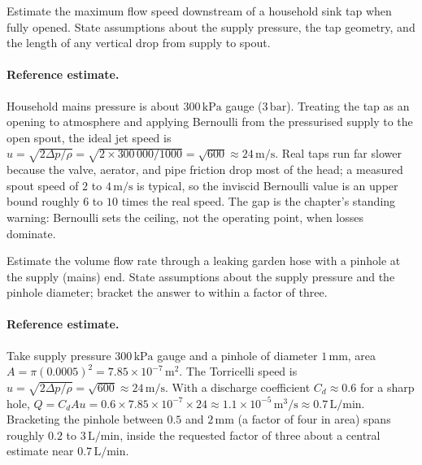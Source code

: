 \begin{exercise}
Estimate the maximum flow speed downstream of a household sink tap
when fully opened. State assumptions about the supply pressure,
the tap geometry, and the length of any vertical drop from supply
to spout.

\paragraph{Reference estimate.} Household mains pressure is about
$300\,\text{kPa}$ gauge ($3\,\text{bar}$). Treating the tap as an
opening to atmosphere and applying Bernoulli from the pressurised
supply to the open spout, the ideal jet speed is $u = \sqrt{2\Delta
p/\rho} = \sqrt{2\times 300\,000/1000} = \sqrt{600} \approx
24\,\si{\meter\per\second}$. Real taps run far slower because the
valve, aerator, and pipe friction drop most of the head; a measured
spout speed of $2$ to $4\,\si{\meter\per\second}$ is typical, so the
inviscid Bernoulli value is an upper bound roughly $6$ to $10$ times
the real speed. The gap is the chapter's standing warning: Bernoulli
sets the ceiling, not the operating point, when losses dominate.
\end{exercise}

\begin{exercise}
Estimate the volume flow rate through a leaking garden hose with a
pinhole at the supply (mains) end. State assumptions about the
supply pressure and the pinhole diameter; bracket the answer to
within a factor of three.

\paragraph{Reference estimate.} Take supply pressure $300\,\text{kPa}$
gauge and a pinhole of diameter $1\,\si{\milli\meter}$, area $A =
\pi(0.0005)^2 = 7.85\times 10^{-7}\,\si{\meter}^2$. The Torricelli
speed is $u = \sqrt{2\Delta p/\rho} = \sqrt{600} \approx
24\,\si{\meter\per\second}$. With a discharge coefficient $C_d
\approx 0.6$ for a sharp hole, $Q = C_d A u = 0.6\times 7.85\times
10^{-7}\times 24 \approx 1.1\times 10^{-5}\,\si{\meter\cubed\per
\second} \approx 0.7\,\text{L/min}$. Bracketing the pinhole between
$0.5$ and $2\,\si{\milli\meter}$ (a factor of four in area) spans
roughly $0.2$ to $3\,\text{L/min}$, inside the requested factor of
three about a central estimate near $0.7\,\text{L/min}$.
\end{exercise}

